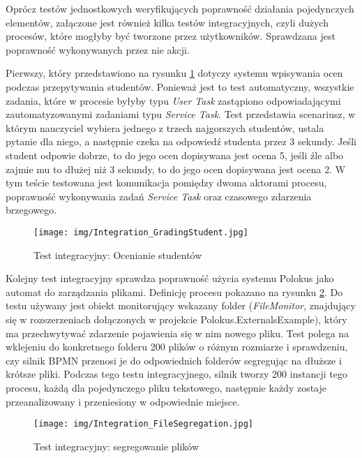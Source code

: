 \documentclass[declaration,shortabstract,mgr]{iithesis}
\newcommand{\bpmn}{BPMN }
\begin{document}
Oprócz testów jednostkowych weryfikujących poprawność działania pojedynczych elementów, załączone jest również kilka testów integracyjnych, czyli dużych procesów, które mogłyby być tworzone przez użytkowników. Sprawdzana jest poprawność wykonywanych przez nie akcji.

Pierwszy, który przedstawiono na rysunku \ref{fig:integration-grading} dotyczy systemu wpisywania ocen podczas przepytywania studentów. Ponieważ jest to test automatyczny, wszystkie zadania, które w procesie byłyby typu \textit{User Task} zastąpiono odpowiadającymi zautomatyzowanymi zadaniami typu \textit{Service Task}. Test przedstawia scenariusz, w którym nauczyciel wybiera jednego z trzech najgorszych studentów, ustala pytanie dla niego, a następnie czeka na odpowiedź studenta przez 3 sekundy. Jeśli student odpowie dobrze, to do jego ocen dopisywana jest ocena 5, jeśli źle albo zajmie mu to dłużej niż 3 sekundy, to do jego ocen dopisywana jest ocena 2. W tym teście testowana jest komunikacja pomiędzy dwoma aktorami procesu, poprawność wykonywania zadań \textit{Service Task} oraz czasowego zdarzenia brzegowego.

\begin{figure}[h]
     \centering
     \texttt{[image: img/Integration\_GradingStudent.jpg]}
     \caption{Test integracyjny: Ocenianie studentów}
     \label{fig:integration-grading}
\end{figure}

Kolejny test integracyjny sprawdza poprawność użycia systemu Polokus jako automat do zarządzania plikami. Definicję procesu pokazano na rysunku \ref{fig:integration-segregation}. Do testu używany jest obiekt monitorujący wskazany folder (\textit{FileMonitor}, znajdujący się w rozszerzeniach dołączonych w projekcie Polokus.ExternalsExample), który ma przechwytywać zdarzenie pojawienia się w nim nowego pliku. Test polega na wklejeniu do konkretnego folderu 200 plików o różnym rozmiarze i sprawdzeniu, czy silnik \bpmn przenosi je do odpowiednich folderów segregując na dłuższe i krótsze pliki. Podczas tego testu integracyjnego, silnik tworzy 200 instancji tego procesu, każdą dla pojedynczego pliku tekstowego, następnie każdy zostaje przeanalizowany i przeniesiony w odpowiednie miejsce.

\begin{figure}[h]
     \centering
     \texttt{[image: img/Integration\_FileSegregation.jpg]}
     \caption{Test integracyjny: segregowanie plików}
     \label{fig:integration-segregation}
\end{figure}
\end{document}
